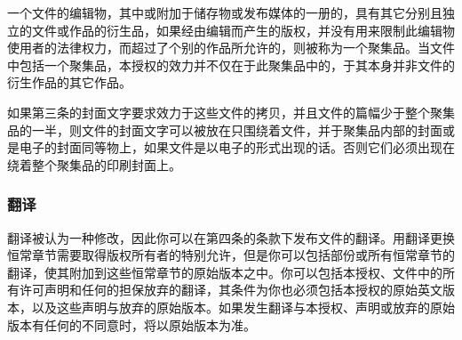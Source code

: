 一个文件的编辑物，其中或附加于储存物或发布媒体的一册的，具有其它分别且独立的文件或作品的衍生品，如果经由编辑而产生的版权，并没有用来限制此编辑物使用者的法律权力，而超过了个别的作品所允许的，则被称为一个聚集品。当文件中包括一个聚集品，本授权的效力并不仅在于此聚集品中的，于其本身并非文件的衍生作品的其它作品。


如果第三条的封面文字要求效力于这些文件的拷贝，并且文件的篇幅少于整个聚集品的一半，则文件的封面文字可以被放在只围绕着文件，并于聚集品内部的封面或是电子的封面同等物上，如果文件是以电子的形式出现的话。否则它们必须出现在绕着整个聚集品的印刷封面上。


\subsubsection{翻译}


翻译被认为一种修改，因此你可以在第四条的条款下发布文件的翻译。用翻译更换恒常章节需要取得版权所有者的特别允许，但是你可以包括部份或所有恒常章节的翻译，使其附加到这些恒常章节的原始版本之中。你可以包括本授权、文件中的所有许可声明和任何的担保放弃的翻译，其条件为你也必须包括本授权的原始英文版本，以及这些声明与放弃的原始版本。如果发生翻译与本授权、声明或放弃的原始版本有任何的不同意时，将以原始版本为准。

